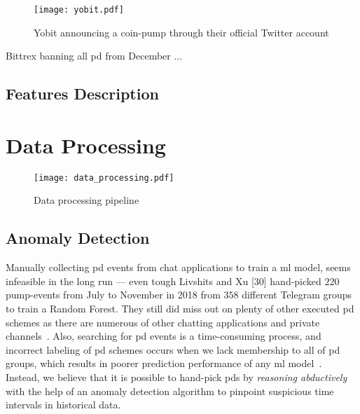 \begin{figure}[ht]
    \centering
    \texttt{[image: yobit.pdf]}
    \caption{Yobit announcing a coin-pump through their official Twitter account}
    \label{fig:yobit}
\end{figure}

Bittrex banning all \ac{pd} from December ...




\subsection{Features Description}



\newpage
\section{Data Processing}

\begin{figure}[ht]
    \centering
    \texttt{[image: data\_processing.pdf]}
    \caption{Data processing pipeline}
    \label{fig:data_processing}
\end{figure}

\subsection{Anomaly Detection}
Manually collecting \ac{pd} events from chat applications to train a \ac{ml} model, seems infeasible in the long run — even tough Livshits and Xu [30] hand-picked $220$ pump-events from July to November in 2018 from $358$ different Telegram groups to train a Random Forest. They still did miss out on plenty of other executed \ac{pd} schemes as there are numerous of other chatting applications and private channels~\cite{blockonomi}. Also, searching for \ac{pd} events is a time-consuming process, and incorrect labeling of \ac{pd} schemes occurs when we lack membership to all of \ac{pd} groups, which results in poorer prediction performance of any \ac{ml} model~\cite{label_noise}. Instead, we believe that it is possible to hand-pick \acp{pd} by \emph{reasoning abductively} with the help of an anomaly detection algorithm to pinpoint suspicious time intervals in historical data.
%

